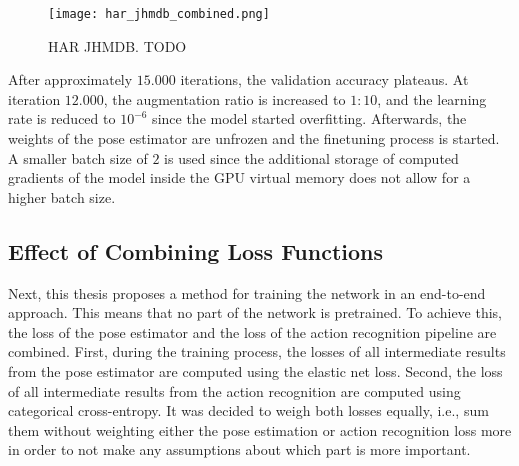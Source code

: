 
\begin{figure}[htb!]
    \centering
    \texttt{[image: har\_jhmdb\_combined.png]}
    \caption{HAR JHMDB. TODO}
    \label{fig:har_jhmdb_combined}
\end{figure}


After approximately $15.000$ iterations, the validation accuracy plateaus.
At iteration $12.000$, the augmentation ratio is increased to $1:10$, and the learning rate is reduced to $10^{-6}$ since the model started overfitting.
Afterwards, the weights of the pose estimator are unfrozen and the finetuning process is started.
A smaller batch size of $2$ is used since the additional storage of computed gradients of the model inside the GPU virtual memory does not allow for a higher batch size.



\subsection{Effect of Combining Loss Functions}
Next, this thesis proposes a method for training the network in an end-to-end approach.
This means that no part of the network is pretrained.
To achieve this, the loss of the pose estimator and the loss of the action recognition pipeline are combined.
First, during the training process, the losses of all intermediate results from the pose estimator are computed using the elastic net loss.
Second, the loss of all intermediate results from the action recognition are computed using categorical cross-entropy.
It was decided to weigh both losses equally, i.e., sum them without weighting either the pose estimation or action recognition loss more in order to not make any assumptions about which part is more important.

